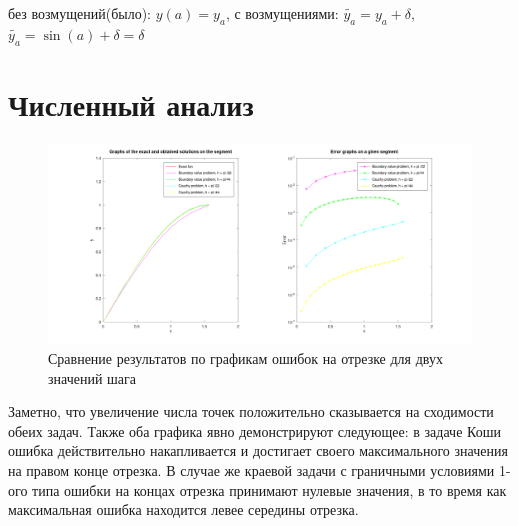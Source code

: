 \documentclass{article}
\begin{document}
	без возмущений(было): $y(a) = y_a$, с возмущениями: $\tilde{y_a} = y_a + \delta$,$\tilde{y_a} = \sin(a)+\delta = \delta$\par
	
	\section{Численный анализ}	
	\begin{figure}[h]
		\centering
		\includegraphics[width=\linewidth]{graphic1.png}
		\caption{Сравнение результатов по графикам ошибок на отрезке для двух значений
			шага}
	\end{figure}
	Заметно, что увеличение числа точек положительно сказывается на сходимости обеих
	задач. Также оба графика явно демонстрируют следующее: в задаче Коши ошибка действительно накапливается и достигает своего максимального значения на правом конце отрезка.
	В случае же краевой задачи с граничными условиями 1-ого типа ошибки на концах отрезка принимают нулевые значения, в то время как максимальная ошибка находится левее середины отрезка.
\end{document}
